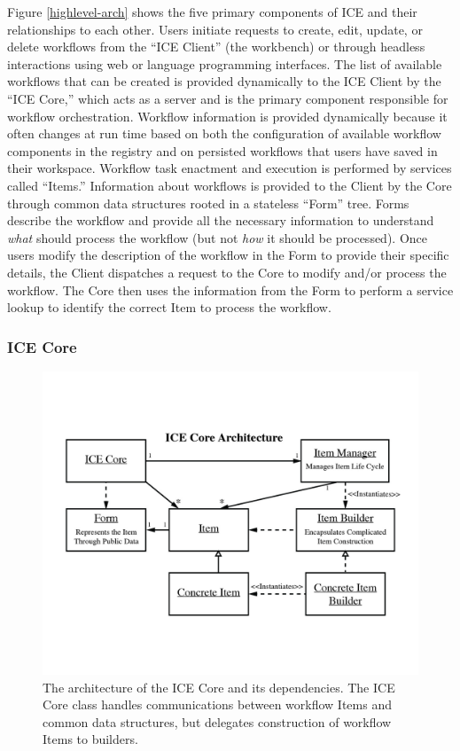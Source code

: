 Figure \ref{highlevel-arch} shows the five primary components of ICE and their relationships to each other. Users initiate requests to create, edit, update, or delete workflows from the ``ICE Client'' (the workbench) or through headless interactions using web or language programming interfaces. The list of available workflows
that can be created is provided dynamically to the ICE Client by
the ``ICE Core,'' which acts as a server and is the primary component responsible for workflow orchestration. Workflow information is
provided dynamically because it often changes at run time based on 
both the configuration of available workflow components in the registry and on
persisted workflows that users have saved in their workspace. Workflow task enactment and execution is performed by services called ``Items.'' Information about workflows is provided to the Client by the Core
through common data structures rooted in a stateless ``Form'' tree. Forms describe the workflow and provide
all the necessary information to understand \emph{what} should process
the workflow (but not \emph{how} it should be processed). Once users
modify the description of the workflow in the Form to provide their
specific details, the Client dispatches a request to the Core to modify
and/or process the workflow. The Core then uses the information from the Form
to perform a service lookup to identify the correct Item to process the workflow.

\subsubsection{ICE Core}

\begin{figure}[htbp]
\centering
\includegraphics[width=\textwidth]{src/images/ICE-arch-2.jpg}
\caption{The architecture of the ICE Core and its dependencies. The ICE Core class handles communications between workflow Items and common data structures, but delegates construction of workflow Items to builders.}
\label{core-arch}
\end{figure}

